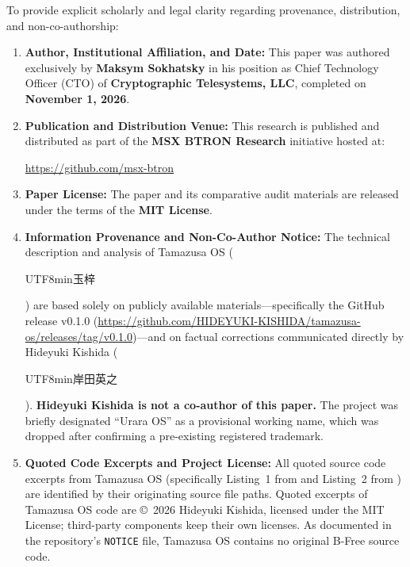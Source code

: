 \documentclass[10pt,journal,compsoc,twocolumn]{article}
\newcommand{\ja}[1]{\begin{CJK*}{UTF8}{min}#1\end{CJK*}}
\begin{document}
To provide explicit scholarly and legal clarity regarding provenance, distribution, and non-co-authorship:
\begin{enumerate}[leftmargin=*]
    \item \textbf{Author, Institutional Affiliation, and Date:} This paper was authored exclusively by \textbf{Maksym Sokhatsky} in his position as Chief Technology Officer (CTO) of \textbf{Cryptographic Telesystems, LLC}, completed on \textbf{November 1, 2026}.
    \item \textbf{Publication and Distribution Venue:} This research is published and distributed as part of the \textbf{MSX BTRON Research} initiative hosted at:
    \begin{center}
    \url{https://github.com/msx-btron}
    \end{center}
    \item \textbf{Paper License:} The paper and its comparative audit materials are released under the terms of the \textbf{MIT License}.
    \item \textbf{Information Provenance and Non-Co-Author Notice:} The technical description and analysis of Tamazusa OS (\ja{玉梓}) are based solely on publicly available materials—specifically the GitHub release v0.1.0 (\url{https://github.com/HIDEYUKI-KISHIDA/tamazusa-os/releases/tag/v0.1.0})—and on factual corrections communicated directly by Hideyuki Kishida (\ja{岸田英之}). \textbf{Hideyuki Kishida is not a co-author of this paper.} The project was briefly designated ``Urara OS'' as a provisional working name, which was dropped after confirming a pre-existing registered trademark.
    \item \textbf{Quoted Code Excerpts and Project License:} All quoted source code excerpts from Tamazusa OS (specifically Listing~1 from  and Listing~2 from ) are identified by their originating source file paths. Quoted excerpts of Tamazusa OS code are \copyright~2026 Hideyuki Kishida, licensed under the MIT License; third-party components keep their own licenses. As documented in the repository's \texttt{NOTICE} file, Tamazusa OS contains no original B-Free source code.
\end{enumerate}
\end{document}
